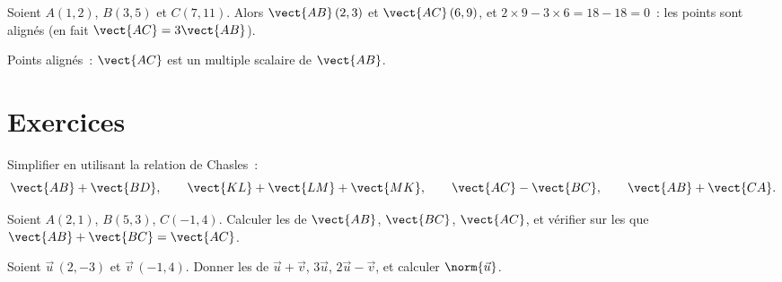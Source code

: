 \begin{example}\label{ex:g10:vectors:alignment}
Soient $A(1, 2)$, $B(3, 5)$ et $C(7, 11)$. Alors $\vect{AB}\,(2, 3)$ et
$\vect{AC}\,(6, 9)$, et $2 \times 9 - 3 \times 6 = 18 - 18 = 0$~: les
points sont alignés (en fait $\vect{AC} = 3\vect{AB}$).
\end{example}

\begin{omfigure}

{\small Points alignés~: $\vect{AC}$ est un multiple scalaire de
$\vect{AB}$.}
\end{omfigure}

\section{Exercices}

\begin{exercise}[$\star$]\label{exo:g10:vectors:1}
Simplifier en utilisant la relation de Chasles~:
\[
\vect{AB} + \vect{BD}, \qquad
\vect{KL} + \vect{LM} + \vect{MK}, \qquad
\vect{AC} - \vect{BC}, \qquad
\vect{AB} + \vect{CA}.
\]
\end{exercise}

\begin{exercise}[$\star$]\label{exo:g10:vectors:2}
Soient $A(2, 1)$, $B(5, 3)$, $C(-1, 4)$. Calculer les  de
$\vect{AB}$, $\vect{BC}$, $\vect{AC}$, et vérifier sur les 
que $\vect{AB} + \vect{BC} = \vect{AC}$.
\end{exercise}

\begin{exercise}[$\star$]\label{exo:g10:vectors:3}
Soient $\vec u\,(2, -3)$ et $\vec v\,(-1, 4)$. Donner les  de
$\vec u + \vec v$, $3\vec u$, $2\vec u - \vec v$, et calculer
$\norm{\vec u}$.
\end{exercise}

